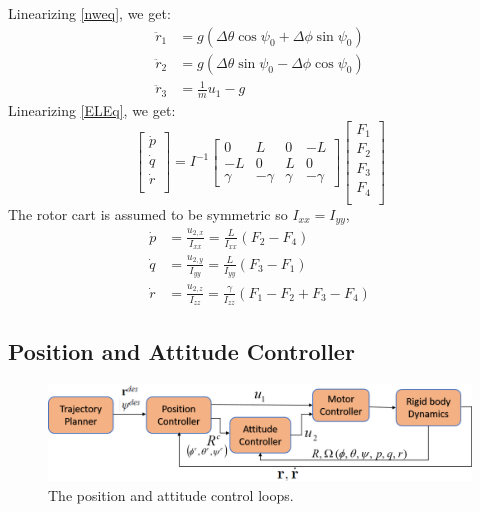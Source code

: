 \documentclass[conference,onecolumn,10pt]{IEEEtran}
\begin{document}
Linearizing \eqref{nweq}, we get: 
\begin{equation}
\begin{aligned}
\label{rddot}
\ddot{r}_1 &= g(\Delta\theta \cos \psi_0 + \Delta \phi \sin \psi_0) \\
\ddot{r}_2 &= g(\Delta\theta \sin \psi_0 - \Delta \phi \cos \psi_0) \\
\ddot{r}_3 &= \frac{1}{m}u_1 - g
\end{aligned}
\end{equation}
Linearizing \eqref{ELEq}, we get: 
\begin{equation}
\label{pqrddot} 
\begin{bmatrix}
\dot{p} \\
\dot{q}\\
\dot{r} \\
\end{bmatrix} = I^{-1}
\begin{bmatrix}
0 & L & 0 & -L \\
-L & 0 & L & 0 \\
\gamma & -\gamma & \gamma & -\gamma
\end{bmatrix}  \begin{bmatrix}
F_1\\
F_2\\
F_3\\
F_4 \\
\end{bmatrix}
\end{equation}
The rotor cart is assumed to be symmetric so $I_{xx} = I_{yy}$, 
\begin{equation}
\begin{aligned}
\dot{p} &= \frac{u_{2,x}}{I_{xx}} = \frac{L}{I_{xx}}(F_2-F_4)\\
\dot{q} &= \frac{u_{2,y}}{I_{yy}} = \frac{L}{I_{yy}}(F_3-F_1)\\
\dot{r} &= \frac{u_{2,z}}{I_{zz}} = \frac{\gamma}{I_{zz}}(F_1-F_2+F_3-F_4)
\end{aligned}
\end{equation}
\subsection{Position and Attitude Controller}
\begin{figure}[h!]
\centering
\includegraphics[scale=0.5]{images/controlmy2.png}
\caption{The position and attitude control loops.}
\label{Control1}
\end{figure}
\end{document}
